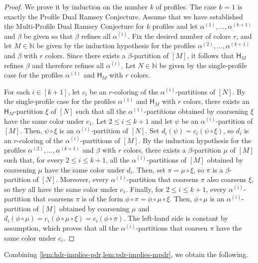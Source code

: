 \documentclass[11pt]{article}
\newcommand{\unif}[1]{\mathsf H_{#1}}
\theoremstyle{remark}
\begin{document}
\begin{proof}
    We prove it by induction on the number $k$ of profiles.
    The case $k=1$ is exactly the Profile Dual Ramsey Conjecture.
    Assume that we have established the Multi-Profile Dual Ramsey Conjecture for $k$ profiles and let $\alpha^{(1)},\ldots,\alpha^{(k+1)}$ and $\beta$ be given so that $\beta$ refines all $\alpha^{(i)}$.
    Fix the desired number of colors $r$, and let $M \in \mathbb{N}$ be given by the induction hypothesis for the profiles $\alpha^{(2)},\ldots,\alpha^{(k+1)}$ and $\beta$ with $r$ colors.
    Since there exists a $\beta$-partition of $[M]$, it follows that $\unif{M}$ refines $\beta$ and therefore refines all $\alpha^{(i)}$.
    Let $N \in \mathbb{N}$ be given by the single-profile case for the profiles $\alpha^{(1)}$ and $\unif{M}$ with $r$ colors.
    
    For each $i \in [k+1]$, let $c_i$ be an $r$-coloring of the $\alpha^{(i)}$-partitions of $[N]$.
    By the single-profile case for the profiles $\alpha^{(1)}$ and $\unif{M}$ with $r$ colors, there exists an $\unif{M}$-partition $\xi$ of $[N]$ such that all the $\alpha^{(1)}$-partitions obtained by coarsening $\xi$ have the same color under $c_1$.
    Let $2 \leq i \leq k+1$ and let $\psi$ be an $\alpha^{(i)}$-partition of $[M]$.
    Then, $\psi \circ \xi$ is an $\alpha^{(i)}$-partition of $[N]$.
    Set $d_i(\psi) = c_i(\psi \circ \xi)$, so $d_i$ is an $r$-coloring of the $\alpha^{(i)}$-partitions of $[M]$.
    By the induction hypothesis for the profiles $\alpha^{(2)},\ldots,\alpha^{(k+1)}$ and $\beta$ with $r$ colors, there exists a $\beta$-partition $\mu$ of $[M]$ such that, for every $2 \leq i \leq k+1$, all the $\alpha^{(i)}$-partitions of $[M]$ obtained by coarsening $\mu$ have the same color under $d_i$.
    Then, set $\pi = \mu \circ \xi$, so $\pi$ is a $\beta$-partition of $[N]$.
    Moreover, every $\alpha^{(1)}$-partition that coarsens $\pi$ also coarsens $\xi$, so they all have the same color under $c_1$.
    Finally, for $2 \leq i \leq k+1$, every $\alpha^{(i)}$-partition that coarsens $\pi$ is of the form $\phi \circ \pi = \phi \circ \mu \circ \xi$. 
    Then, $\phi \circ \mu$ is an $\alpha^{(i)}$-partition of $[M]$ obtained by coarsening $\mu$ and $d_i(\phi \circ \mu) = c_i(\phi \circ \mu \circ \xi) = c_i(\phi \circ \pi)$.
    The left-hand side is constant by assumption, which proves that all the $\alpha^{(i)}$-partitions that coarsen $\pi$ have the same color under $c_i$.
\end{proof}

Combining \cref{lem:hdr-implies-pdr,lem:pdr-implies-mpdr}, we obtain the following.
\end{document}
